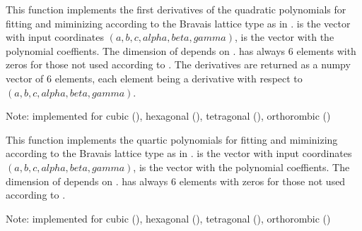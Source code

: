 \documentclass[letterpaper,10pt,english]{sphinxmanual}
\begin{document}

\begin{fulllineitems}
\label{pyqha:pyqha.minutils.fquadratic_der}
This function implements the first derivatives of the quadratic polynomials 
for fitting and miminizing according to the Bravais lattice type as in . 
 is the vector with input coordinates \((a,b,c,alpha,beta,gamma)\),
 is the vector
with the polynomial coeffients. The dimension of  depends on
.  has always 6 elements with zeros for those not used according to
.
The derivatives are returned as a numpy vector of 6 elements, each element 
being a derivative with respect to \((a,b,c,alpha,beta,gamma)\).

Note: implemented for cubic (), hexagonal (), 
tetragonal (), orthorombic ()

\end{fulllineitems}


\begin{fulllineitems}
\label{pyqha:pyqha.minutils.fquartic}
This function implements the quartic polynomials for fitting and miminizing
according to the Bravais lattice type as in .
 is the vector with input coordinates \((a,b,c,alpha,beta,gamma)\),
 is the vector
with the polynomial coeffients. The dimension of  depends on
.  has always 6 elements with zeros for those not used according to
.

Note: implemented for cubic (), hexagonal (), 
tetragonal (), orthorombic ()

\end{fulllineitems}
\end{document}
